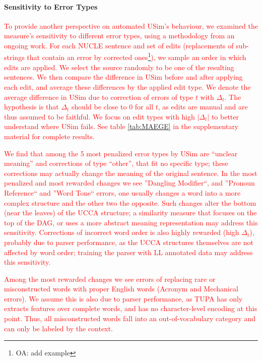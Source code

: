 \documentclass[a4paper, 11pt]{article}
\newcommand{\oa}[1]{\footnote{\color{red}OA: #1}}
\begin{document}
\paragraph{Sensitivity to Error Types}
\textcolor{red}{
To provide another perspective on automated {\sc USim}'s behaviour,
we examined the measure's sensitivity to different error types, using a methodology from an ongoing work. 
For each NUCLE sentence and set of edits (replacements of sub-strings that contain an error by corrected ones\oa{add example}), we sample an order in which edits are applied.
We select the source randomly to be one of the resulting sentences. 
We then compare the difference in {\sc USim} before and after applying each edit, and average these differences by the applied edit type. 
We denote the average difference in {\sc USim} due to correction of errors of type $t$ with $\Delta_t$.
The hypothesis is that $\Delta_t$ should be close to 0 for all $t$, as edits are manual and are thus assumed to be faithful.
We focus on edit types with high $|\Delta_t|$ to better understand where {\sc USim} fails. See table \ref{tab:MAEGE} in the supplementary material for complete results.}

\textcolor{red}{We find that among the 5 most penalized error types by {\sc USim} are ``unclear meaning'' and corrections of type ``other'', that fit no specific type; these corrections may actually change the meaning of the original sentence. In the most penalized and most rewarded changes we see ''Dangling Modifier``, and ''Pronoun Reference`` and ''Word Tone`` errors, one usually changes a word into a more complex structure and the other two the opposite. Such changes alter the bottom (near the leaves) of the UCCA structure; a similarity measure that focuses on the top of the DAG, or uses a more abstract meaning representation may address this sensitivity. Corrections of incorrect word order is also highly rewarded (high $\Delta_t$), probably due to parser performance, as the UCCA structures themselves are not affected by word order; training the parser with LL annotated data may address this sensitivity.}
	
\textcolor{red}{Among the most rewarded changes we see errors of replacing rare or misconstructed words with proper English words (Acronym and Mechanical errors). We assume this is also due to parser performance, as TUPA has only extracts features over complete words, and has no character-level encoding at this point. Thus, all misconstructed words fall into an out-of-vocabulary category and can only be labeled by the context.}
\end{document}
